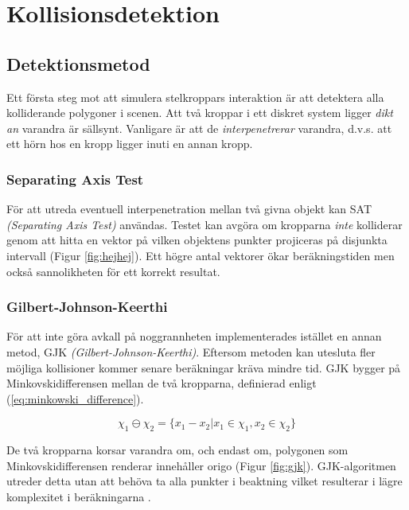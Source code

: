 \documentclass[a4paper,12pt,twopage,swedish]{article}
\begin{document}

\section{Kollisionsdetektion}

\subsection{Detektionsmetod}
Ett första steg mot att simulera stelkroppars interaktion är att detektera alla kolliderande polygoner i scenen. Att två kroppar i ett diskret system ligger \emph{dikt an} varandra är sällsynt. Vanligare är att de \emph{interpenetrerar} varandra, d.v.s. att ett hörn hos en kropp ligger inuti en annan kropp.

\subsubsection{Separating Axis Test}
För att utreda eventuell interpenetration mellan två givna objekt kan SAT\cite[s.~29]{vella08} \emph{(Separating Axis Test)} användas. Testet kan avgöra om kropparna \emph{inte} kolliderar genom att hitta en vektor på vilken objektens punkter projiceras på disjunkta intervall (Figur \ref{fig:hejhej}). Ett högre antal vektorer ökar beräkningstiden men också sannolikheten för ett korrekt resultat.

\subsubsection{Gilbert-Johnson-Keerthi}
\label{sec:gjk}
För att inte göra avkall på noggrannheten implementerades istället en annan metod, GJK \cite[s.~30]{vella08} \emph{(Gilbert-Johnson-Keerthi)}. Eftersom metoden kan utesluta fler möjliga kollisioner kommer senare beräkningar kräva mindre tid. GJK bygger på Minkovskidifferensen mellan de två kropparna, definierad enligt (\ref{eq:minkowski_difference}).

\begin{equation}\label{eq:minkowski_difference}
\chi_1 \ominus \chi_2 = \{ x_1 - x_2|x_1 \in \chi_1, x_2 \in \chi_2 \}
\end{equation}

De två kropparna korsar varandra om, och endast om, polygonen som Minkovskidifferensen renderar innehåller origo (Figur \ref{fig:gjk}). GJK-algoritmen utreder detta utan att behöva ta alla punkter i beaktning vilket resulterar i lägre komplexitet i beräkningarna \cite{bergen99}.
\end{document}
